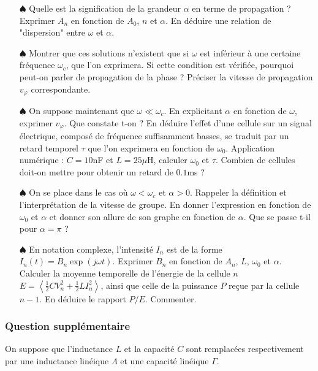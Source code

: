 \documentclass{report}
\begin{document}
\begin{itemize}

	\item[$\spadesuit$] Quelle est la signification de la grandeur $\alpha$ en terme de propagation ? Exprimer $A_n$ en fonction de $A_0$, $n$ et $\alpha$. En déduire une relation de "dispersion" entre $\omega$ et $\alpha$.

	\item[$\spadesuit$] Montrer que ces solutions n'existent que si $\omega$ est inférieur à une certaine fréquence $\omega_c$, que l'on exprimera. Si cette condition est vérifiée, pourquoi peut-on parler de propagation de la phase ? Préciser la vitesse de propagation $v_\varphi$ correspondante.
	
	\item[$\spadesuit$] On suppose maintenant que $\omega\ll\omega_c$. En explicitant $\alpha$ en fonction de $\omega$, exprimer $v_\varphi$. Que constate t-on ? En déduire l'effet d'une cellule sur un signal électrique, composé de fréquence suffisamment basses, se traduit par un retard temporel $\tau$ que l'on exprimera en fonction de $\omega_0$. Application numérique : $C=10$nF et $L=25\mu$H, calculer $\omega_0$ et $\tau$. Combien de cellules doit-on mettre pour obtenir un retard de $0.1$ms ?

	\item[$\spadesuit$] On se place dans le cas où $\omega<\omega_c$ et $\alpha>0$. Rappeler la définition et l'interprétation de la vitesse de groupe. En donner l'expression en fonction de $\omega_0$ et $\alpha$ et donner son allure de son graphe en fonction de $\alpha$. Que se passe t-il pour $\alpha=\pi$ ?
	
	\item[$\spadesuit$] En notation complexe, l'intensité $I_n$ est de la forme $I_n(t)=B_n\exp(j\omega t)$. Exprimer $B_n$ en fonction de $A_n$, $L$, $\omega_0$ et $\alpha$. Calculer la moyenne temporelle de l'énergie de la cellule $n$ $E=\left\langle \frac{1}{2}CV_n^2+\frac{1}{2}LI_n^2\right\rangle$, ainsi que celle de la puissance $P$ reçue par la cellule $n-1$. En déduire le rapport $P/E$. Commenter.  	

\end{itemize}

\subsubsection*{Question supplémentaire}

On suppose que l'inductance $L$ et la capacité $C$ sont remplacées respectivement par une inductance linéique $\Lambda$ et une capacité linéique $\Gamma$. 
\end{document}
